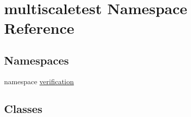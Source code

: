 \hypertarget{namespacemultiscaletest}{\section{multiscaletest \-Namespace \-Reference}
\label{namespacemultiscaletest}
}
\subsection*{\-Namespaces}
\begin{DoxyCompactItemize}
\item 
namespace \hyperlink{namespacemultiscaletest_1_1verification}{verification}
\end{DoxyCompactItemize}
\subsection*{\-Classes}
